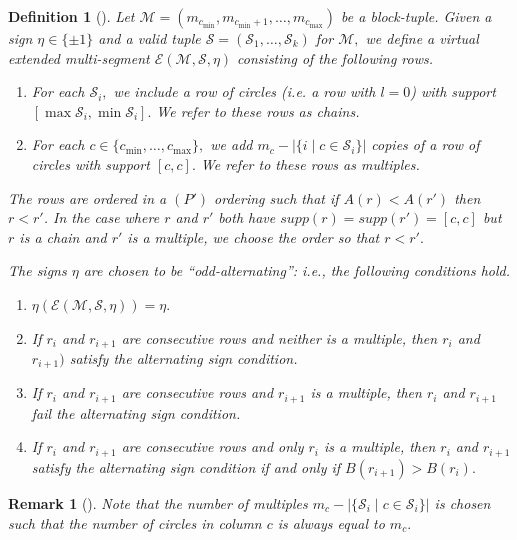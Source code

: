 \documentclass[11pt,letterpaper]{amsart}
\newcommand{\EE}{\mathcal{E}}
\newtheorem{defn}[thm]{Definition}
\newtheorem{rmk}[thm]{Remark}
\numberwithin{equation}{section}
\begin{document}
\begin{defn}[{\cite[Definition 5.2]{HKT26}}]\label{defn E(M,S)}
    Let $\mathcal{M}= (m_{c_{\min}}, m_{c_{\min} + 1}, \dots, m_{c_{\max}})$ be a block-tuple. Given a sign $\eta \in \{\pm 1\}$ and a valid tuple $\mathcal{S}=(\mathcal{S}_1,\dots,\mathcal{S}_k)$ for $\mathcal{M},$ we define a virtual extended multi-segment $\EE(\mathcal{M}, \mathcal{S}, \eta)$ consisting of the following rows.
    \begin{enumerate}
    \item For each $\mathcal{S}_i,$ we include a row of circles (i.e. a row with $l=0$) with support 
    $[\max \mathcal{S}_i, \min \mathcal{S}_i].$
    We refer to these rows as \emph{chains}.
    \item For each $c \in \{c_{\min}, \dots, c_{\max}\},$ we add $m_c - |\{i \mid c \in \mathcal{S}_i\}|$ copies of a row of circles with support
    $[c, c].$
    We refer to these rows as \emph{multiples}.
\end{enumerate}

The rows are ordered in a $(P')$ ordering such that if $A(r) < A(r')$ then $r < r'$. In the case where $r$ and $r'$ both have $supp(r) = supp(r') = [c, c]$ but $r$ is a chain and $r'$ is a multiple, we choose the order so that $r < r'.$

The signs $\eta$ are chosen to be ``odd-alternating'': i.e., the following conditions hold.
    \begin{enumerate}
        \item $\eta(\mathcal{E}(\mathcal{M}, \mathcal{S}, \eta)) = \eta.$
        \item If $r_i$ and $r_{i + 1}$ are consecutive rows and neither is a multiple, then $r_i$ and $r_{i + 1})$ satisfy the alternating sign condition.
        \item If $r_i$ and $r_{i + 1}$ are consecutive rows and $r_{i + 1}$ is a multiple, then $r_i$ and $r_{i + 1}$ fail the alternating sign condition.
        \item If $r_i$ and $r_{i + 1}$ are consecutive rows and only $r_{i}$ is a multiple, then $r_i$ and $r_{i+1}$ satisfy the alternating sign condition if and only if $B(r_{i + 1}) > B(r_i).$
    \end{enumerate}
\end{defn}

\begin{rmk}[{\cite[Remark 5.3]{HKT26}}]
    Note that the number of multiples $m_c - |\{\mathcal{S}_i \mid c \in \mathcal{S}_i\}|$ is chosen such that the number of circles in column $c$ is always equal to $m_c.$
\end{rmk}
\end{document}
